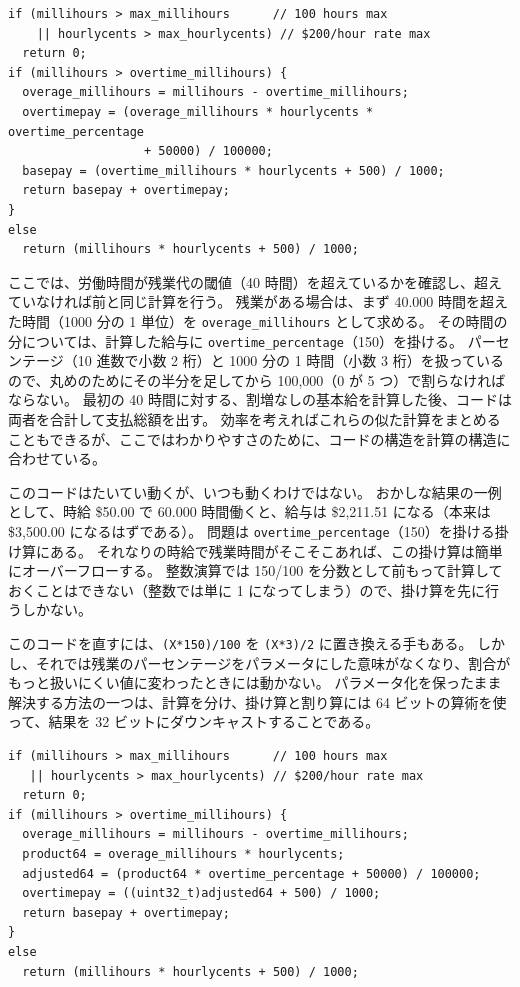 \documentclass[uplatex]{jsarticle}
\begin{document}
\begin{verbatim}
if (millihours > max_millihours      // 100 hours max
    || hourlycents > max_hourlycents) // $200/hour rate max
  return 0;
if (millihours > overtime_millihours) {
  overage_millihours = millihours - overtime_millihours;
  overtimepay = (overage_millihours * hourlycents * overtime_percentage
                   + 50000) / 100000;
  basepay = (overtime_millihours * hourlycents + 500) / 1000;
  return basepay + overtimepay;
}
else
  return (millihours * hourlycents + 500) / 1000;
\end{verbatim}

ここでは、労働時間が残業代の閾値（40 時間）を超えているかを確認し、超えていなければ前と同じ計算を行う。
残業がある場合は、まず 40.000 時間を超えた時間（1000 分の 1 単位）を \texttt{overage\_millihours} として求める。
その時間の分については、計算した給与に \texttt{overtime\_percentage}（150）を掛ける。
パーセンテージ（10 進数で小数 2 桁）と 1000 分の 1 時間（小数 3 桁）を扱っているので、丸めのためにその半分を足してから 100,000（0 が 5 つ）で割らなければならない。
最初の 40 時間に対する、割増なしの基本給を計算した後、コードは両者を合計して支払総額を出す。
効率を考えればこれらの似た計算をまとめることもできるが、ここではわかりやすさのために、コードの構造を計算の構造に合わせている。

このコードはたいてい動くが、いつも動くわけではない。
おかしな結果の一例として、時給 \$50.00 で 60.000 時間働くと、給与は \$2,211.51 になる（本来は \$3,500.00 になるはずである）。
問題は \texttt{overtime\_percentage}（150）を掛ける掛け算にある。
それなりの時給で残業時間がそこそこあれば、この掛け算は簡単にオーバーフローする。
整数演算では 150/100 を分数として前もって計算しておくことはできない（整数では単に 1 になってしまう）ので、掛け算を先に行うしかない。

このコードを直すには、\texttt{(X*150)/100} を \texttt{(X*3)/2} に置き換える手もある。
しかし、それでは残業のパーセンテージをパラメータにした意味がなくなり、割合がもっと扱いにくい値に変わったときには動かない。
パラメータ化を保ったまま解決する方法の一つは、計算を分け、掛け算と割り算には 64 ビットの算術を使って、結果を 32 ビットにダウンキャストすることである。

\begin{verbatim}
if (millihours > max_millihours      // 100 hours max
   || hourlycents > max_hourlycents) // $200/hour rate max
  return 0;
if (millihours > overtime_millihours) {
  overage_millihours = millihours - overtime_millihours;
  product64 = overage_millihours * hourlycents;
  adjusted64 = (product64 * overtime_percentage + 50000) / 100000;
  overtimepay = ((uint32_t)adjusted64 + 500) / 1000;
  return basepay + overtimepay;
}
else
  return (millihours * hourlycents + 500) / 1000;
\end{verbatim}
\end{document}
